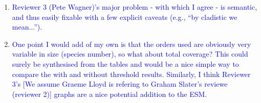 \documentclass[12pt,letterpaper]{article}
\begin{document}
\begin{enumerate}


\item{\textcolor{blue}{Reviewer 3 (Pete Wagner)'s major problem - with which I agree - is semantic, and thus easily fixable with a few explicit caveats (e.g., ``by cladistic we mean...'').}}

\item{\textcolor{blue}{One point I would add of my own is that the orders used are obviously very variable in size (species number), so what about total coverage?
This could surely be synthesised from the tables and would be a nice simple way to compare the with and without threshold results.
Similarly, I think Reviewer 3's [We assume Graeme Lloyd is refering to Graham Slater's reviewe (reviewer 2)] %
 graphs are a nice potential addition to the ESM.}}
\end{enumerate}

\end{document}
